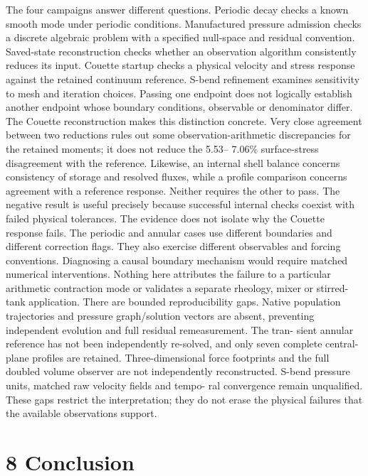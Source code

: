 \documentclass[11pt]{article}
\begin{document}
The four campaigns answer different questions. Periodic decay checks a known smooth mode
under periodic conditions. Manufactured pressure admission checks a discrete algebraic problem
with a specified null-space and residual convention. Saved-state reconstruction checks whether an
observation algorithm consistently reduces its input. Couette startup checks a physical velocity and
stress response against the retained continuum reference. S-bend refinement examines sensitivity
to mesh and iteration choices. Passing one endpoint does not logically establish another endpoint
whose boundary conditions, observable or denominator differ.
The Couette reconstruction makes this distinction concrete. Very close agreement between two
reductions rules out some observation-arithmetic discrepancies for the retained moments; it does
not reduce the 5.53– 7.06\% surface-stress disagreement with the reference. Likewise, an internal shell
balance concerns consistency of storage and resolved fluxes, while a profile comparison concerns
agreement with a reference response. Neither requires the other to pass. The negative result is
useful precisely because successful internal checks coexist with failed physical tolerances.
The evidence does not isolate why the Couette response fails. The periodic and annular cases use
different boundaries and different correction flags. They also exercise different observables and
forcing conventions. Diagnosing a causal boundary mechanism would require matched numerical
interventions. Nothing here attributes the failure to a particular arithmetic contraction mode or
validates a separate rheology, mixer or stirred-tank application.
There are bounded reproducibility gaps. Native population trajectories and pressure graph/solution
vectors are absent, preventing independent evolution and full residual remeasurement. The tran-
sient annular reference has not been independently re-solved, and only seven complete central-plane
profiles are retained. Three-dimensional force footprints and the full doubled volume observer are
not independently reconstructed. S-bend pressure units, matched raw velocity fields and tempo-
ral convergence remain unqualified. These gaps restrict the interpretation; they do not erase the
physical failures that the available observations support.

\section*{8 Conclusion}
\end{document}
